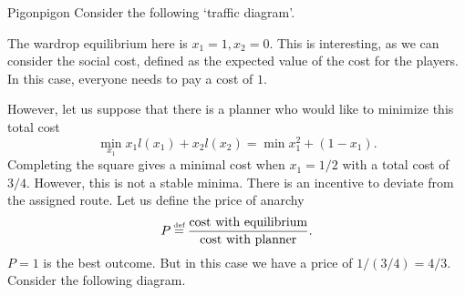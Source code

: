 \begin{aexample}{Pigon}{pigon}
    Consider the following `traffic diagram'.
    \begin{center}
    \end{center}
\end{aexample}
The wardrop equilibrium here is $x_1=1,x_2=0$. 
This is interesting, as we can consider the social cost, defined as the expected value of the cost for the players. In this case, everyone needs to pay a cost of $1$.

However, let us suppose that there is a planner who would like to minimize this total cost \[
\min_{x_1} x_1l(x_1)+x_2l(x_2) = \min x_1^2+(1-x_1).
\]
Completing the square gives a minimal cost when $x_1=1/2$ with a total cost of $3/4$. However, this is not a stable minima. There is an incentive to deviate from the assigned route.
    Let us define the price of anarchy \[
    P \defeq \frac{\textrm{cost with equilibrium}}{\textrm{cost with planner}}.
    \]
$P=1$ is the best outcome. But in this case we have a price of $1/(3/4) = 4/3$.
Consider the following diagram.
\begin{center}
    \end{center}


